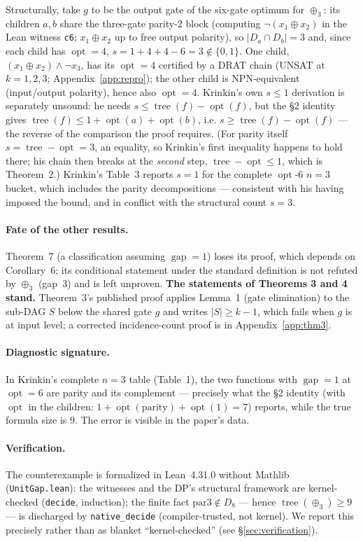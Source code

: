 \documentclass[11pt]{article}
\DeclareMathOperator{\opt}{opt}
\DeclareMathOperator{\tree}{tree}
\DeclareMathOperator{\gapop}{gap}
\theoremstyle{plain}
\begin{document}
Structurally, take $g$ to be the output gate of the six-gate optimum for $\oplus_3$: its children
$a, b$ share the three-gate parity-2 block (computing $\neg(x_1 \oplus x_2)$ in the Lean witness
\texttt{c6}; $x_1 \oplus x_2$ up to free output polarity), so $|D_a \cap D_b| = 3$ and, since each
child has $\opt = 4$, $s = 1 + 4 + 4 - 6 = 3 \notin \{0,1\}$. One child,
$(x_1 \oplus x_2) \wedge \neg x_3$, has its $\opt = 4$ certified by a DRAT chain (UNSAT at
$k = 1,2,3$; Appendix~\ref{app:repro}); the other child is NPN-equivalent (input/output polarity),
hence also $\opt = 4$. Krinkin's own $s \le 1$ derivation is separately unsound: he needs
$s \le \tree(f) - \opt(f)$, but the \S2 identity gives $\tree(f) \le 1 + \opt(a) + \opt(b)$, i.e.
$s \ge \tree(f) - \opt(f)$ --- the reverse of the comparison the proof requires. (For parity itself
$s = \tree - \opt = 3$, an equality, so Krinkin's first inequality happens to hold there; his chain
then breaks at the \emph{second} step, $\tree - \opt \le 1$, which is Theorem~2.) Krinkin's Table~3
reports $s = 1$ for the complete $\opt$-6 $n = 3$ bucket, which includes the parity decompositions
--- consistent with his having imposed the bound, and in conflict with the structural count
$s = 3$.

\paragraph{Fate of the other results.} Theorem~7 (a classification assuming $\gapop = 1$) loses its
proof, which depends on Corollary~6; its conditional statement under the standard definition is not
refuted by $\oplus_3$ (gap~3) and is left unproven. \textbf{The statements of Theorems 3 and 4 stand.} Theorem~3's
published proof applies Lemma~1 (gate elimination) to the sub-DAG $S$ below the shared gate $g$ and
writes $|S| \ge k-1$, which fails when $g$ is at input level; a corrected incidence-count proof is
in Appendix~\ref{app:thm3}.

\paragraph{Diagnostic signature.} In Krinkin's complete $n = 3$ table (Table~1), the two functions
with $\gapop = 1$ at $\opt = 6$ are parity and its complement --- precisely what the \S2 identity
(with $\opt$ in the children: $1 + \opt(\text{parity}) + \opt(1) = 7$) reports, while the true
formula size is 9. The error is visible in the paper's data.

\paragraph{Verification.} The counterexample is formalized in Lean~4.31.0 without Mathlib
(\texttt{UnitGap.lean}): the witnesses and the DP's structural framework are kernel-checked
(\texttt{decide}, induction); the finite fact $\mathrm{par3} \notin D_8$ --- hence
$\tree(\oplus_3) \ge 9$ --- is discharged by \texttt{native\_decide} (compiler-trusted, not kernel).
We report this precisely rather than as blanket ``kernel-checked'' (see \S\ref{sec:verification}).
\end{document}
